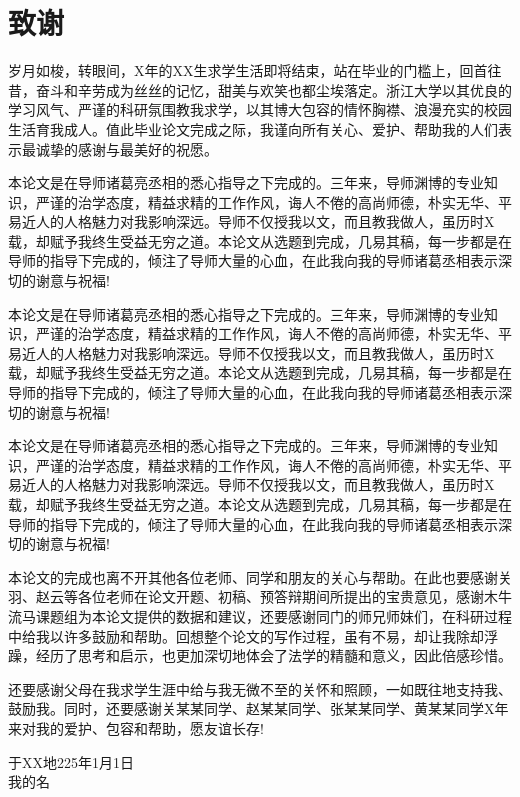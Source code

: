 \chapter{致\texorpdfstring{\ZJUspace}{}谢}
岁月如梭，转眼间，X年的XX生求学生活即将结束，站在毕业的门槛上，回首往昔，奋斗和辛劳成为丝丝的记忆，甜美与欢笑也都尘埃落定。浙江大学以其优良的学习风气、严谨的科研氛围教我求学，以其博大包容的情怀胸襟、浪漫充实的校园生活育我成人。值此毕业论文完成之际，我谨向所有关心、爱护、帮助我的人们表示最诚挚的感谢与最美好的祝愿。

本论文是在导师诸葛亮丞相的悉心指导之下完成的。三年来，导师渊博的专业知识，严谨的治学态度，精益求精的工作作风，诲人不倦的高尚师德，朴实无华、平易近人的人格魅力对我影响深远。导师不仅授我以文，而且教我做人，虽历时X载，却赋予我终生受益无穷之道。本论文从选题到完成，几易其稿，每一步都是在导师的指导下完成的，倾注了导师大量的心血，在此我向我的导师诸葛丞相表示深切的谢意与祝福!


本论文是在导师诸葛亮丞相的悉心指导之下完成的。三年来，导师渊博的专业知识，严谨的治学态度，精益求精的工作作风，诲人不倦的高尚师德，朴实无华、平易近人的人格魅力对我影响深远。导师不仅授我以文，而且教我做人，虽历时X载，却赋予我终生受益无穷之道。本论文从选题到完成，几易其稿，每一步都是在导师的指导下完成的，倾注了导师大量的心血，在此我向我的导师诸葛丞相表示深切的谢意与祝福!


本论文是在导师诸葛亮丞相的悉心指导之下完成的。三年来，导师渊博的专业知识，严谨的治学态度，精益求精的工作作风，诲人不倦的高尚师德，朴实无华、平易近人的人格魅力对我影响深远。导师不仅授我以文，而且教我做人，虽历时X载，却赋予我终生受益无穷之道。本论文从选题到完成，几易其稿，每一步都是在导师的指导下完成的，倾注了导师大量的心血，在此我向我的导师诸葛丞相表示深切的谢意与祝福!

本论文的完成也离不开其他各位老师、同学和朋友的关心与帮助。在此也要感谢关羽、赵云等各位老师在论文开题、初稿、预答辩期间所提出的宝贵意见，感谢木牛流马课题组为本论文提供的数据和建议，还要感谢同门的师兄师妹们，在科研过程中给我以许多鼓励和帮助。回想整个论文的写作过程，虽有不易，却让我除却浮躁，经历了思考和启示，也更加深切地体会了法学的精髓和意义，因此倍感珍惜。

还要感谢父母在我求学生涯中给与我无微不至的关怀和照顾，一如既往地支持我、鼓励我。同时，还要感谢关某某同学、赵某某同学、张某某同学、黄某某同学X年来对我的爱护、包容和帮助，愿友谊长存!

\vspace{2cm}
\hfill
\begin{minipage}{14em}
\begin{center}
于XX地\quad 225年1月1日\\
我的名
\end{center}
\end{minipage}
